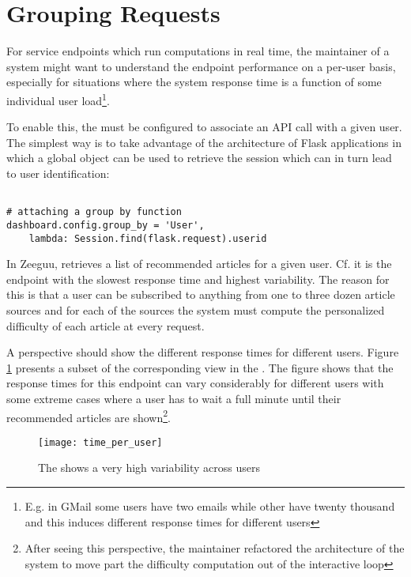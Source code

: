 
\section{Grouping Requests}
\label{sec:user}

For service endpoints which run computations in real time, the maintainer of a system might want to understand the endpoint performance on a per-user basis, especially for situations where the system response time is a function of some individual user load\footnote{E.g. in GMail some users have two emails while other have twenty thousand and this induces different response times for different users}.

To enable this, the \tool must be configured to associate an API call with a given user. The simplest way is to take advantage of the architecture of Flask applications in which a global  object can be used to retrieve the session which can in turn lead to user identification: 

\begin{lstlisting}[style=custompython]  

# attaching a group by function 
dashboard.config.group_by = 'User',
	lambda: Session.find(flask.request).userid

\end{lstlisting}



In Zeeguu, \epFeedItems retrieves a list of recommended articles for a given user. Cf.  it is the endpoint with the slowest response time and highest variability. The reason for this is that a user can be subscribed to anything from one to three dozen article sources and for each of the sources the system must compute the personalized difficulty of each article at every request. 


A  perspective should show the different response times for different users. Figure \ref{fig:tpu} presents a subset of the corresponding view in the \tool. The figure shows that the response times for this endpoint can vary considerably for different users with some extreme cases where a user has to wait a full minute until their recommended articles are shown\footnote{After seeing this perspective, the maintainer refactored the architecture of the system to move part the difficulty computation out of the interactive loop}.


\begin{figure}[h!]
  \centering
  \texttt{[image: time\_per\_user]}
  \caption{The \epFeedItems shows a very high variability across users}
  \label{fig:tpu}
\end{figure}






